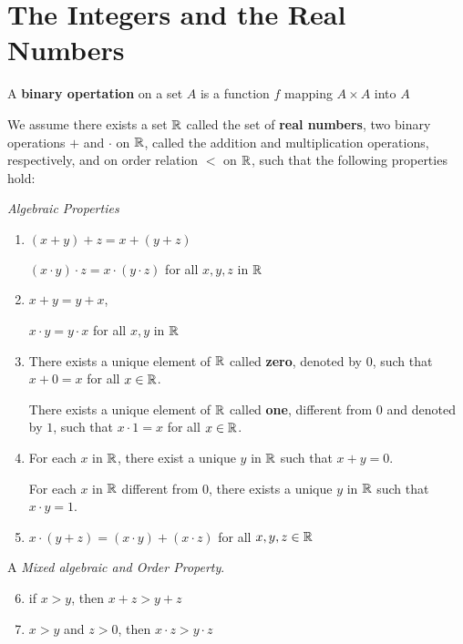 \section{The Integers and the Real Numbers}

\begin{defn}
	A \textbf{binary opertation} on a set $ A $ is a function $ f $ mapping $ A \times A $ into $ A $
\end{defn}

We assume there exists a set $ \mathbb{R} $ called the set of \textbf{real numbers}, two binary operations $ + $ and $ \cdot $ on $ \mathbb{R} $, called the addition and multiplication operations, respectively, and on order relation $ < $ on $ \mathbb{R} $, such that the following properties hold:

\textit{Algebraic Properties}

\begin{enumerate}
	\item $ (x + y) + z = x + (y + z) $
	
	$ (x \cdot y) \cdot z = x \cdot (y \cdot z) $ for all $ x,y,z $ in $ \mathbb{R} $
	
	\item $ x + y = y + x $,
	
	$ x \cdot y = y \cdot x $ for all $ x,y  $ in $ \mathbb{R} $
	
	\item There exists a unique element of $ \mathbb{R} $ called \textbf{zero}, denoted by $ 0 $, such that $ x + 0 = x $ for all $ x \in \mathbb{R} $.
	
	There exists a unique element of $ \mathbb{R} $ called \textbf{one}, different from $ 0 $ and denoted by $ 1 $, such that $ x \cdot 1 = x $ for all $ x \in \mathbb{R} $.
	
	\item For each $ x $ in $ \mathbb{R} $, there exist a unique $ y  $ in $ \mathbb{R} $ such that $ x + y = 0 $.
	
	For each $ x $ in $ \mathbb{R} $ different from $ 0 $, there exists a unique $ y $ in $ \mathbb{R} $ such that $ x \cdot y = 1 $.
	
	\item $ x \cdot (y + z) = (x \cdot y) + (x \cdot z) $ for all $ x,y,z \in \mathbb{R} $
\end{enumerate}

A \textit{Mixed algebraic and Order Property}.

\begin{enumerate}
	\setcounter{enumi}{5}
	\item if $ x > y $, then $ x +z > y + z $
	\item $ x > y $ and $ z > 0 $, then $ x\cdot z > y \cdot z $
\end{enumerate}

